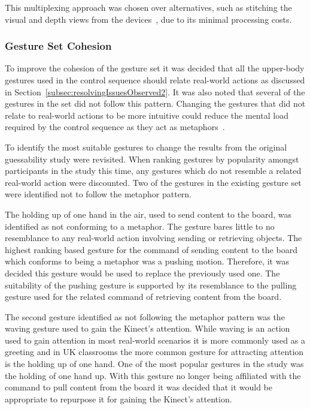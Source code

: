 \documentclass[link]{IWCOMP}
\begin{document}
This multiplexing approach was chosen over alternatives, such as stitching the visual and depth views from the devices~\citep{Dubois2011}, due to its minimal processing costs.

\subsubsection{Gesture Set Cohesion} 
\label{subsubsec:studyImplementationGestureSet}

To improve the cohesion of the gesture set it was decided that all the upper-body gestures used in the control sequence should relate real-world actions as discussed in Section~\ref{subsec:resolvingIssuesObserved2}.
It was also noted that several of the gestures in the set did not follow this pattern.
Changing the gestures that did not relate to real-world actions to be more intuitive could reduce the mental load required by the control sequence as they act as metaphors~\citep{Wang2008}.

To identify the most suitable gestures to change the results from the original guessability study were revisited.
When ranking gestures by popularity amongst participants in the study this time, any gestures which do not resemble a related real-world action were discounted.
Two of the gestures in the existing gesture set were identified not to follow the metaphor pattern.

The holding up of one hand in the air, used to send content to the board, was identified as not conforming to a metaphor.
The gesture bares little to no resemblance to any real-world action involving sending or retrieving objects.
The highest ranking based gesture for the command of sending content to the board which conforms to being a metaphor was a pushing motion.
Therefore, it was decided this gesture would be used to replace the previously used one.
The suitability of the pushing gesture is supported by its resemblance to the pulling gesture used for the related command of retrieving content from the board.

The second gesture identified as not following the metaphor pattern was the waving gesture used to gain the Kinect's attention.
While waving is an action used to gain attention in most real-world scenarios it is more commonly used as a greeting and in UK classrooms the more common gesture for attracting attention is the holding up of one hand.
One of the most popular gestures in the study was the holding of one hand up.
With this gesture no longer being affiliated with the command to pull content from the board it was decided that it would be appropriate to repurpose it for gaining the Kinect's attention.
\end{document}
